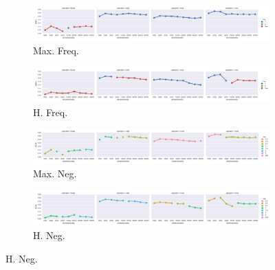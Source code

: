 

\begin{landscape}

\begin{figure}
  \centering

  \begin{subfigure}[t]{0.7\textwidth}
    \includegraphics[width=\textwidth]{supplement/figures/KS14-max_-selection-freq}
    \caption{Max. Freq.}
    \label{fig:}
  \end{subfigure}
  \begin{subfigure}[t]{0.7\textwidth}
    \includegraphics[width=\textwidth]{supplement/figures/KS14-heuristics-selection-freq}
    \caption{H. Freq.}
    \label{fig:}
  \end{subfigure}

  \begin{subfigure}[t]{0.7\textwidth}
    \includegraphics[width=\textwidth]{supplement/figures/KS14-max_-selection-neg}
    \caption{Max. Neg.}
    \label{fig:}
  \end{subfigure}
  \begin{subfigure}[t]{0.7\textwidth}
    \includegraphics[width=\textwidth]{supplement/figures/KS14-heuristics-selection-neg}
    \caption{H. Neg.}
    \label{fig:}
  \end{subfigure}


\end{figure}
\end{landscape}
